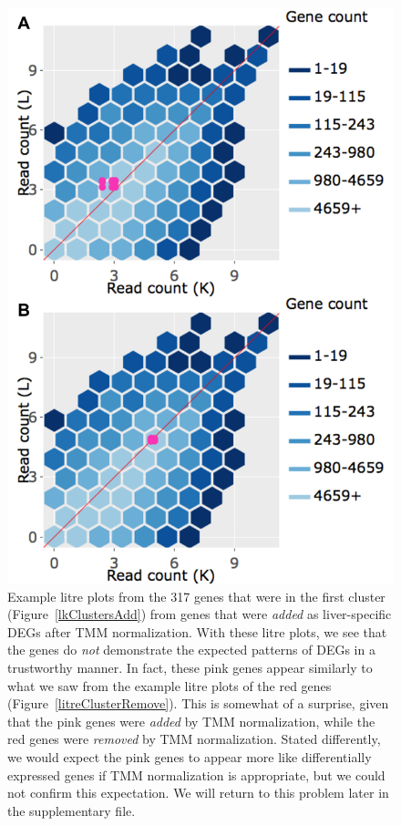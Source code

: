 \documentclass[11pt,a4paper,oldfontcommands,openany]{memoir}
\numberwithin{equation}{section} %
\begin{document}
\null
\begin{figure}[t!]
\begin{framed}
\centerline{\includegraphics[width=0.7\columnwidth]{MakeFigures/Dashboards/litreClusterAdd/litreClusterAdd.jpg}}
\end{framed}
\caption{Example litre plots from the 317 genes that were in the first cluster (Figure~\ref{lkClustersAdd}) from genes that were \textit{added} as liver-specific DEGs after TMM normalization. With these litre plots, we see that the genes do \textit{not} demonstrate the expected patterns of DEGs in a trustworthy manner. In fact, these pink genes appear similarly to what we saw from the example litre plots of the red genes (Figure~\ref{litreClusterRemove}). This is somewhat of a surprise, given that the pink genes were \textit{added} by TMM  normalization, while the red genes were \textit{removed} by TMM normalization. Stated differently, we would expect the pink genes to appear more like differentially expressed genes if TMM normalization is appropriate, but we could not confirm this expectation. We will return to this problem later in the supplementary file.
\label{litreClusterAdd}}
\end{figure}
\end{document}

